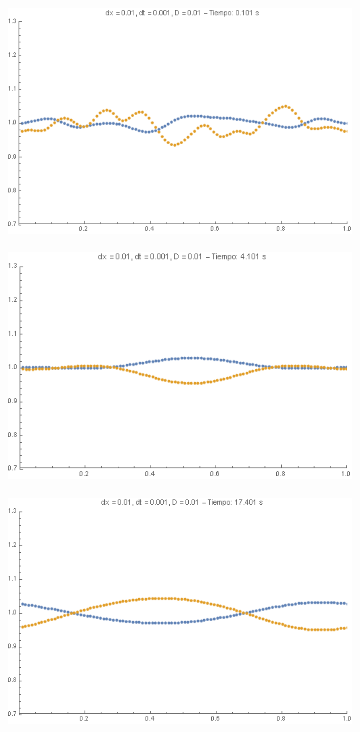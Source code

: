 \documentclass[aps,prb,twocolumn,superscriptaddress,floatfix,longbibliography]{revtex4-2}
\begin{document}
\begin{figure}[h]
     \centering
     \begin{subfigure}[b]{0.3\textwidth}
         \centering
         \includegraphics[width=\textwidth]{D_0.01_t1.png}
         \caption{\label{fig:D_0.01_t1}}
     \end{subfigure}
     \hfill
     \begin{subfigure}[b]{0.3\textwidth}
         \centering
         \includegraphics[width=\textwidth]{D_0.01_t2.png}
         \caption{\label{fig:D_0.01_t2}}
     \end{subfigure}
     \hfill
     \begin{subfigure}[b]{0.3\textwidth}
         \centering
         \includegraphics[width=\textwidth]{D_0.01_t3.png}

\end{subfigure}
\end{figure}
\end{document}
